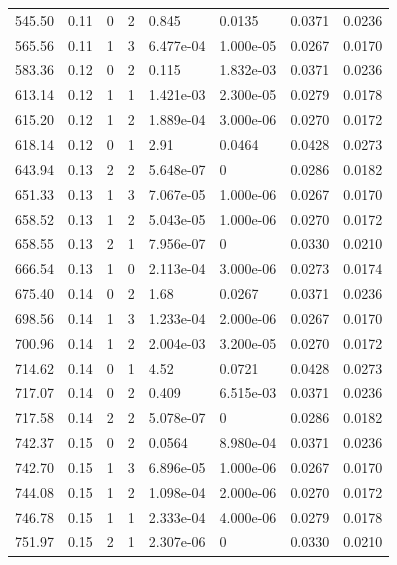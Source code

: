 \documentclass[preview]{standalone}
\begin{document}
{{{\begin{tabular}{L{1.2cm}C{1.2cm} C{0.3cm}C{0.5cm} C{1.4cm}C{1.4cm} C{1.4cm}C{1.4cm}}
  545.50  &  0.11  & 0     &  2 &  0.845  & 0.0135  & 0.0371 &  0.0236   \\ 
  565.56  &  0.11  & 1     &  3 &  6.477e-04  & 1.000e-05  & 0.0267 &  0.0170   \\ 
  583.36  &  0.12  & 0     &  2 &  0.115  & 1.832e-03  & 0.0371 &  0.0236   \\ 
  613.14  &  0.12  & 1     &  1 &  1.421e-03  & 2.300e-05  & 0.0279 &  0.0178   \\ 
  615.20  &  0.12  & 1     &  2 &  1.889e-04  & 3.000e-06  & 0.0270 &  0.0172   \\ 
  618.14  &  0.12  & 0     &  1 &  2.91  & 0.0464  & 0.0428 &  0.0273   \\ 
  643.94  &  0.13  & 2     &  2 &  5.648e-07  & 0  & 0.0286 &  0.0182   \\ 
  651.33  &  0.13  & 1     &  3 &  7.067e-05  & 1.000e-06  & 0.0267 &  0.0170   \\ 
  658.52  &  0.13  & 1     &  2 &  5.043e-05  & 1.000e-06  & 0.0270 &  0.0172   \\ 
  658.55  &  0.13  & 2     &  1 &  7.956e-07  & 0  & 0.0330 &  0.0210   \\ 
  666.54  &  0.13  & 1     &  0 &  2.113e-04  & 3.000e-06  & 0.0273 &  0.0174   \\ 
  675.40  &  0.14  & 0     &  2 &  1.68  & 0.0267  & 0.0371 &  0.0236   \\ 
  698.56  &  0.14  & 1     &  3 &  1.233e-04  & 2.000e-06  & 0.0267 &  0.0170   \\ 
  700.96  &  0.14  & 1     &  2 &  2.004e-03  & 3.200e-05  & 0.0270 &  0.0172   \\ 
  714.62  &  0.14  & 0     &  1 &  4.52  & 0.0721  & 0.0428 &  0.0273   \\ 
  717.07  &  0.14  & 0     &  2 &  0.409  & 6.515e-03  & 0.0371 &  0.0236   \\ 
  717.58  &  0.14  & 2     &  2 &  5.078e-07  & 0  & 0.0286 &  0.0182   \\ 
  742.37  &  0.15  & 0     &  2 &  0.0564  & 8.980e-04  & 0.0371 &  0.0236   \\ 
  742.70  &  0.15  & 1     &  3 &  6.896e-05  & 1.000e-06  & 0.0267 &  0.0170   \\ 
  744.08  &  0.15  & 1     &  2 &  1.098e-04  & 2.000e-06  & 0.0270 &  0.0172   \\ 
  746.78  &  0.15  & 1     &  1 &  2.333e-04  & 4.000e-06  & 0.0279 &  0.0178   \\ 
  751.97  &  0.15  & 2     &  1 &  2.307e-06  & 0  & 0.0330 &  0.0210   \\ 

\end{tabular}}}}
\end{document}
